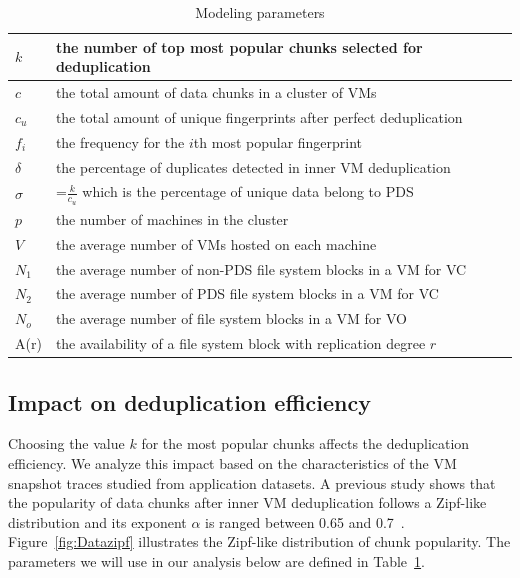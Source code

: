 \begin{table}[htbp]
\centering
\begin{tabular}{|p{1.25cm}|p{5.5cm}|}
\hline
$k$ &  the number of top most popular chunks selected for deduplication\\ 
\hline
$c$ &  the total amount of data chunks in a cluster of VMs\\ 
\hline
$c_u$ &  the total amount of unique fingerprints after perfect  deduplication\\
\hline
$f_i$ &  the frequency for the $i$th most popular fingerprint\\
\hline
$\delta$ &  the percentage of duplicates detected in inner VM deduplication\\
\hline
$\sigma$ & =$\frac{k}{c_u}$ which is  the percentage of unique data  belong to  PDS\\
\hline
$p$ & the number of machines in the cluster\\
\hline
$V$ & the average number of VMs hosted on each machine\\
\hline
$N_1$ & the average number  of non-PDS file system blocks  in a VM for VC\\
\hline
$N_2$ & the average number  of PDS file system blocks  in a VM for VC\\
\hline
$N_o$ & the average number  of file system blocks  in a VM for VO\\
\hline
A(r) & the availability of a file system block with replication degree $r$\\
\hline
\end{tabular}
\caption{Modeling  parameters}
\label{tab:symbol}
\end{table}

\subsection{Impact on deduplication efficiency}
Choosing the value  $k$ for the most popular chunks affects the deduplication efficiency.
We analyze this impact based on the characteristics  of the VM snapshot traces
studied from  application datasets.
A previous study shows that the popularity of data chunks after inner VM deduplication follows 
a Zipf-like distribution\cite{Breslau1999a} and its
exponent $\alpha$ is ranged between 0.65  and  0.7~\cite{WeiZhangIEEE}. 
Figure~\ref{fig:Datazipf} illustrates the Zipf-like distribution of chunk popularity.
The parameters we will use in our analysis below are defined in
Table~\ref{tab:symbol}. 

